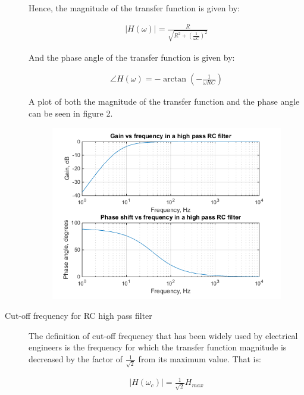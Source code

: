 \documentclass{article}
\begin{document}
\begin{description}
Hence, the magnitude of the transfer function is given by:

\begin{align}
	|H(\omega)| = \frac{R}{\sqrt{R^2 + (\frac{1}{\omega C})^2}}
\end{align}

And the phase angle of the transfer function is given by:

\begin{align}
	\angle H(\omega) = - \arctan (-\frac{1}{\omega RC})
\end{align}

A plot of both the magnitude of the transfer function and the phase angle can be seen in figure 2.

\begin{center}
	\begin{figure}[H]
		\begin{minipage}{0.6\textwidth}
			\includegraphics[scale=0.8]{bode1}
		\end{minipage}
	\end{figure}
\end{center}

\item[Cut-off frequency for RC high pass filter]
The definition of cut-off frequency that has been widely used by electrical engineers is the frequency for which the transfer function magnitude is decreased by the factor of $\frac{1}{\sqrt{2}}$ from its maximum value. That is:

\begin{align*}
	|H(\omega_c)| = \frac{1}{\sqrt{2}}H_{max}
\end{align*}


\end{description}
\end{document}
